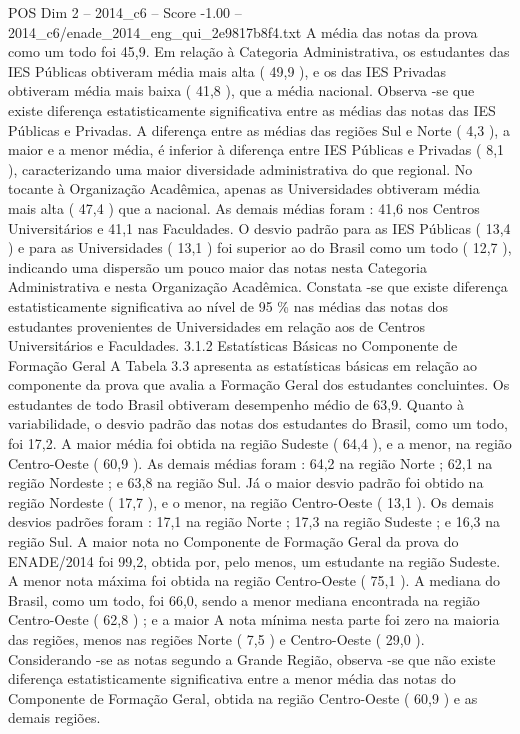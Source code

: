 \begin{textsample}{POS Dim 2 – 2014\_c6 – Score -1.00 – 2014\_c6/enade\_2014\_eng\_qui\_2e9817b8f4.txt}
A média das notas da prova como um todo foi 45,9.
Em relação à Categoria Administrativa, os estudantes das IES Públicas obtiveram média mais alta ( 49,9 ), e os das IES Privadas obtiveram média mais baixa ( 41,8 ), que a média nacional.
Observa -se que existe diferença estatisticamente significativa entre as médias das notas das IES Públicas e Privadas.
A diferença entre as médias das regiões Sul e Norte ( 4,3 ), a maior e a menor média, é inferior à diferença entre IES Públicas e Privadas ( 8,1 ), caracterizando uma maior diversidade administrativa do que regional.
No tocante à Organização Acadêmica, apenas as Universidades obtiveram média mais alta ( 47,4 ) que a nacional.
As demais médias foram : 41,6 nos Centros Universitários e 41,1 nas Faculdades.
O desvio padrão para as IES Públicas ( 13,4 ) e para as Universidades ( 13,1 ) foi superior ao do Brasil como um todo ( 12,7 ), indicando uma dispersão um pouco maior das notas nesta Categoria Administrativa e nesta Organização Acadêmica.
Constata -se que existe diferença estatisticamente significativa ao nível de 95 \% nas médias das notas dos estudantes provenientes de Universidades em relação aos de Centros Universitários e Faculdades. 3.1.2 Estatísticas Básicas no Componente de Formação Geral A Tabela 3.3 apresenta as estatísticas básicas em relação ao componente da prova que avalia a Formação Geral dos estudantes concluintes.
Os estudantes de todo Brasil obtiveram desempenho médio de 63,9.
Quanto à variabilidade, o desvio padrão das notas dos estudantes do Brasil, como um todo, foi 17,2.
A maior média foi obtida na região Sudeste ( 64,4 ), e a menor, na região Centro-Oeste ( 60,9 ).
As demais médias foram : 64,2 na região Norte ; 62,1 na região Nordeste ; e 63,8 na região Sul.
Já o maior desvio padrão foi obtido na região Nordeste ( 17,7 ), e o menor, na região Centro-Oeste ( 13,1 ).
Os demais desvios padrões foram : 17,1 na região Norte ; 17,3 na região Sudeste ; e 16,3 na região Sul.
A maior nota no Componente de Formação Geral da prova do ENADE/2014 foi 99,2, obtida por, pelo menos, um estudante na região Sudeste.
A menor nota máxima foi obtida na região Centro-Oeste ( 75,1 ).
A mediana do Brasil, como um todo, foi 66,0, sendo a menor mediana encontrada na região Centro-Oeste ( 62,8 ) ; e a maior A nota mínima nesta parte foi zero na maioria das regiões, menos nas regiões Norte ( 7,5 ) e Centro-Oeste ( 29,0 ).
Considerando -se as notas segundo a Grande Região, observa -se que não existe diferença estatisticamente significativa entre a menor média das notas do Componente de Formação Geral, obtida na região Centro-Oeste ( 60,9 ) e as demais regiões.

\end{textsample}
